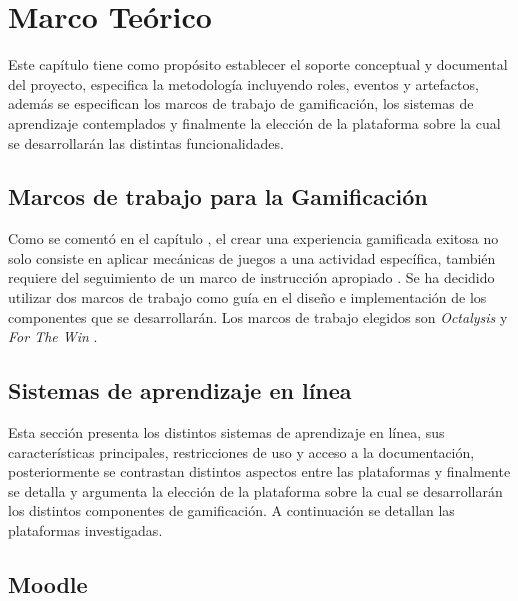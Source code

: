 \chapter{Marco Teórico}
\label{ch:marcoTeorico}

 Este capítulo tiene como propósito establecer el soporte conceptual y documental del proyecto,
 especifica la metodología incluyendo roles, eventos y artefactos, además se especifican los
 marcos de trabajo de gamificación, los sistemas de aprendizaje contemplados y finalmente
 la elección de la plataforma sobre la cual se desarrollarán las distintas funcionalidades.

    

\section{Marcos de trabajo para la Gamificación}

 Como se comentó en el capítulo , el crear una experiencia
 gamificada exitosa no solo consiste en aplicar mecánicas de juegos a una actividad
 específica, también requiere del seguimiento de un marco de instrucción apropiado \cite[p. 1110]{GamInE-Learning}.
 Se ha decidido utilizar dos marcos de trabajo como guía en el diseño e implementación
 de los componentes que se desarrollarán. Los marcos de trabajo elegidos son {\it Octalysis}
 \cite{Octalysis} y {\it For The Win} \cite{ForTheWin}.

    
    

\clearpage
\section{Sistemas de aprendizaje en línea}
\label{sec:sistemasaprendizaje}

 Esta sección presenta los distintos sistemas de aprendizaje en línea, sus características
 principales, restricciones de uso y acceso a la documentación, posteriormente se contrastan
 distintos aspectos entre las plataformas y finalmente se detalla y argumenta la elección de
 la plataforma sobre la cual se desarrollarán los distintos componentes de gamificación.
 A continuación se detallan las plataformas investigadas.

    

\clearpage
\section{Moodle}\label{sec:moodle}

